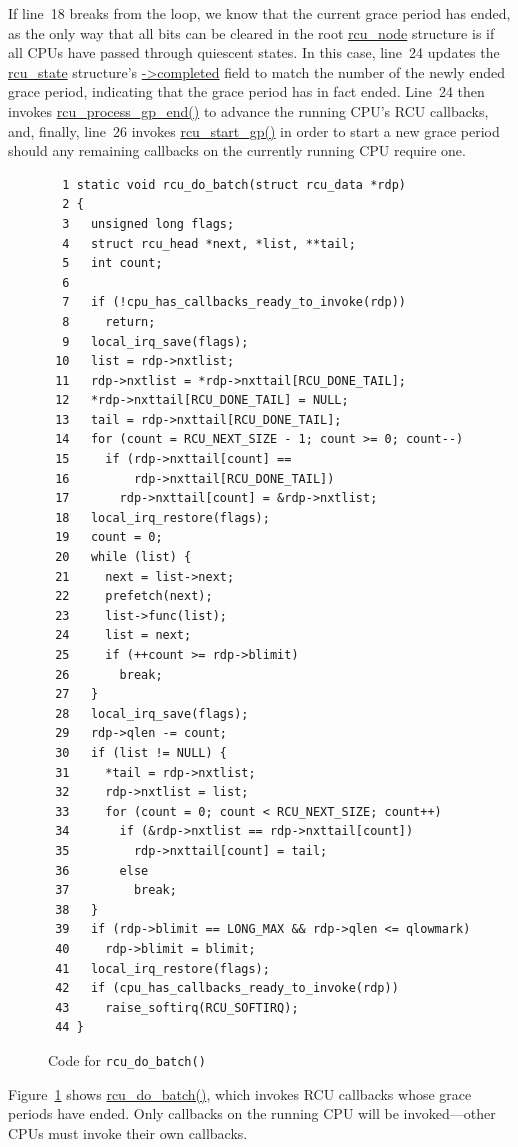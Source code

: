 If line~18 breaks from the loop, we know that the current grace period
has ended, as the only way that all bits can be cleared in the
root \url{rcu_node} structure is if all CPUs have passed through
quiescent states.
In this case, line~24 updates the \url{rcu_state} structure's
\url{->completed} field to match the number of the newly ended grace
period, indicating that the grace period has in fact ended.
Line~24 then invokes \url{rcu_process_gp_end()} to advance the
running CPU's RCU callbacks,
and, finally, line~26 invokes \url{rcu_start_gp()} in order to
start a new grace period should any remaining callbacks on the currently
running CPU require one.

\begin{figure}[tbp]
{ \scriptsize
\begin{verbatim}
  1 static void rcu_do_batch(struct rcu_data *rdp)
  2 {
  3   unsigned long flags;
  4   struct rcu_head *next, *list, **tail;
  5   int count;
  6
  7   if (!cpu_has_callbacks_ready_to_invoke(rdp))
  8     return;
  9   local_irq_save(flags);
 10   list = rdp->nxtlist;
 11   rdp->nxtlist = *rdp->nxttail[RCU_DONE_TAIL];
 12   *rdp->nxttail[RCU_DONE_TAIL] = NULL;
 13   tail = rdp->nxttail[RCU_DONE_TAIL];
 14   for (count = RCU_NEXT_SIZE - 1; count >= 0; count--)
 15     if (rdp->nxttail[count] ==
 16         rdp->nxttail[RCU_DONE_TAIL])
 17       rdp->nxttail[count] = &rdp->nxtlist;
 18   local_irq_restore(flags);
 19   count = 0;
 20   while (list) {
 21     next = list->next;
 22     prefetch(next);
 23     list->func(list);
 24     list = next;
 25     if (++count >= rdp->blimit)
 26       break;
 27   }
 28   local_irq_save(flags);
 29   rdp->qlen -= count;
 30   if (list != NULL) {
 31     *tail = rdp->nxtlist;
 32     rdp->nxtlist = list;
 33     for (count = 0; count < RCU_NEXT_SIZE; count++)
 34       if (&rdp->nxtlist == rdp->nxttail[count])
 35         rdp->nxttail[count] = tail;
 36       else
 37         break;
 38   }
 39   if (rdp->blimit == LONG_MAX && rdp->qlen <= qlowmark)
 40     rdp->blimit = blimit;
 41   local_irq_restore(flags);
 42   if (cpu_has_callbacks_ready_to_invoke(rdp))
 43     raise_softirq(RCU_SOFTIRQ);
 44 }
\end{verbatim}
}
\caption{Code for {\tt rcu\_do\_batch()}}
\label{fig:app:rcuimpl:rcutreewt:Code for rcu-do-batch}
\end{figure}

Figure~\ref{fig:app:rcuimpl:rcutreewt:Code for rcu-do-batch}
shows \url{rcu_do_batch()}, which invokes RCU callbacks
whose grace periods have ended.
Only callbacks on the running CPU will be invoked---other CPUs must
invoke their own callbacks.

